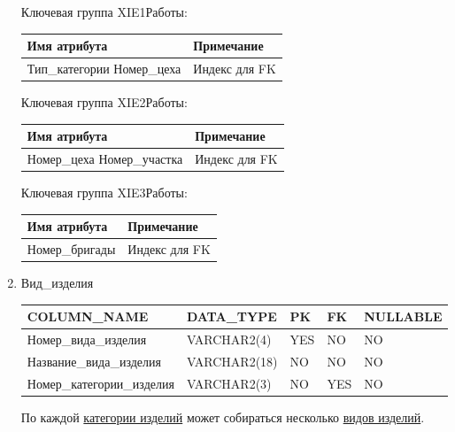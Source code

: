 \begin{enumerate}
    Ключевая группа XIE1Работы:

    \begin{tabular}{|p{7cm}|p{9.3cm}|} \hline

        {\bf Имя атрибута} & {\bf Примечание} \\ \hline
        Тип\_категории \newline Номер\_цеха & Индекс для FK \\ \hline

    \end{tabular}

    Ключевая группа XIE2Работы:

    \begin{tabular}{|p{7cm}|p{9.3cm}|} \hline

        {\bf Имя атрибута} & {\bf Примечание} \\ \hline
        Номер\_цеха \newline Номер\_участка & Индекс для FK \\ \hline

    \end{tabular}

    Ключевая группа XIE3Работы:

    \begin{tabular}{|p{7cm}|p{9.3cm}|} \hline

        {\bf Имя атрибута} & {\bf Примечание} \\ \hline
        Номер\_бригады & Индекс для FK \\ \hline

    \end{tabular}

    \item{Вид\_изделия}

    \begin{tabular}{|p{7cm}|p{3cm}|p{1cm}|p{1cm}|p{3cm}|} \hline

        {\bf COLUMN\_NAME} & {\bf DATA\_TYPE} & {\bf PK} & {\bf FK} & {\bf NULLABLE} \\ \hline
        Номер\_вида\_изделия & VARCHAR2(4) & YES & NO & NO \\ \hline
        Название\_вида\_изделия & VARCHAR2(18) & NO & NO & NO \\ \hline
        Номер\_категории\_изделия & VARCHAR2(3) & NO & YES & NO \\ \hline

    \end{tabular}

    По каждой \underline{категории изделий} может собираться несколько \underline{видов изделий}.


\end{enumerate}
